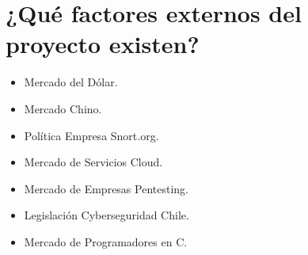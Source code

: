 \documentclass[11pt]{utalcaDoc}
\begin{document}
\section{¿Qué factores externos del proyecto existen?}
\begin{itemize}
  
  \item{Mercado del Dólar.}
  \item{Mercado Chino.}
  \item{Política Empresa Snort.org.}
  \item{Mercado de Servicios Cloud.}
  \item{Mercado de Empresas Pentesting.}
  \item{Legislación Cyberseguridad Chile.}
  \item{Mercado de Programadores en C.}

\end{itemize}
\end{document}
